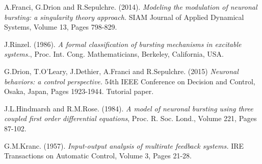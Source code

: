 \documentclass[a4paper, 12pt]{article}
\begin{document}
\begin{thebibliography}{9}
A.Franci, G.Drion and R.Sepulchre. (2014). \emph{Modeling the modulation of neuronal bursting: a singularity theory approach.} SIAM Journal of Applied Dynamical Systems, Volume 13, Pages 798-829. 

J.Rinzel. (1986). \emph{A formal classification of bursting mechanisms in excitable systems.}, Proc. Int. Cong. Mathematicians, Berkeley, California, USA. 

G.Drion, T.O'Leary, J.Dethier, A.Franci and R.Sepulchre. (2015) \emph{Neuronal behaviors: a control perspective.} 54th IEEE Conference on Decision and Control, Osaka, Japan, Pages 1923-1944. Tutorial paper.

J.L.Hindmarsh and R.M.Rose. (1984). \emph{A model of neuronal bursting using three coupled first order differential equations}, Proc. R. Soc. Lond., Volume 221, Pages 87-102. 

G.M.Kranc. (1957). \emph{Input-output analysis of multirate feedback systems.} IRE Transactions on Automatic Control, Volume 3, Pages 21-28. 

\end{thebibliography}
\end{document}
